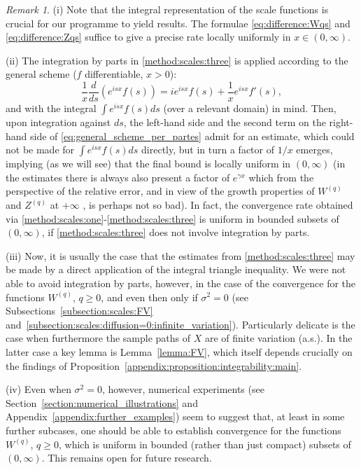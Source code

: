 \documentclass[pdftex,oneside,11pt,reqno]{amsart}
\theoremstyle{definition}
\theoremstyle{theorem}
\theoremstyle{remark}
\newtheorem{remark}{Remark}[section]
\numberwithin{equation}{section}
\numberwithin{definition}{section}
\begin{document}
\begin{remark}

\noindent (i)  Note that the integral representation of the scale functions is crucial for our programme to yield results. The formulae \eqref{eq:difference:Wqs} and \eqref{eq:difference:Zqs} suffice to give a precise rate 
locally uniformly in $x\in (0,\infty)$. 

\noindent (ii) The integration by parts in \eqref{method:scales:three} is applied according to the general scheme ($f$ differentiable, $x>0$): 
\begin{equation}\label{eq:general_scheme_per_partes}
\frac{1}{x}\frac{d}{ds}\left( e^{isx}f(s)\right)=ie^{isx}f(s)+\frac{1}{x}e^{isx}f'(s),
\end{equation}
and with the integral $\int e^{isx}f(s) ds$ (over a relevant domain) in mind. Then, upon integration against $ds$, the left-hand side and the second term on the right-hand side of \eqref{eq:general_scheme_per_partes} admit for an estimate, which could not be made for $\int e^{isx}f(s) ds$ directly, but in turn a factor of $1/x$ emerges, implying (as we will see) that the final bound is locally uniform in $(0,\infty)$ (in the estimates there is always also present a factor of $e^{\gamma x}$ which from the perspective of the relative error, and in view of the growth properties of ${W^{(q)}}$ and ${Z^{(q)}}$ at $+\infty$ \cite[p.  129, Lemma~3.3]{kuznetsovkyprianourivero}, is perhaps not so bad). In fact, the convergence rate obtained via \eqref{method:scales:one}-\eqref{method:scales:three} is uniform in bounded subsets of $(0,\infty)$, if \eqref{method:scales:three} does not involve integration by parts. 

\noindent (iii) Now, it is usually the case that the estimates from \eqref{method:scales:three} may be made by a direct application of the integral triangle inequality. We were not able to avoid integration by parts, however, in the case of the convergence for the functions ${W^{(q)}}$, $q\geq 0$, and even then only if ${\sigma^2}=0$ (see Subsections~\ref{subsection:scales:FV} and~\ref{subsection:scales:diffusion=0:infinite_variation}). Particularly delicate is the case when furthermore the sample paths of $X$ are of finite variation (a.s.). In the latter case a key lemma is Lemma~\ref{lemma:FV}, which itself depends crucially on the findings of Proposition~\ref{appendix:proposition:integrability:main}. 

\noindent (iv) Even when ${\sigma^2}=0$, however, numerical experiments (see Section~\ref{section:numerical_illustrations} and Appendix~\ref{appendix:further_examples}) seem to suggest that, at least in some further subcases, one should be able to establish convergence for the functions ${W^{(q)}}$, $q\geq 0$, which is uniform in bounded (rather than just compact) subsets of $(0,\infty)$. This remains open for future research. 
\end{remark}
\end{document}

